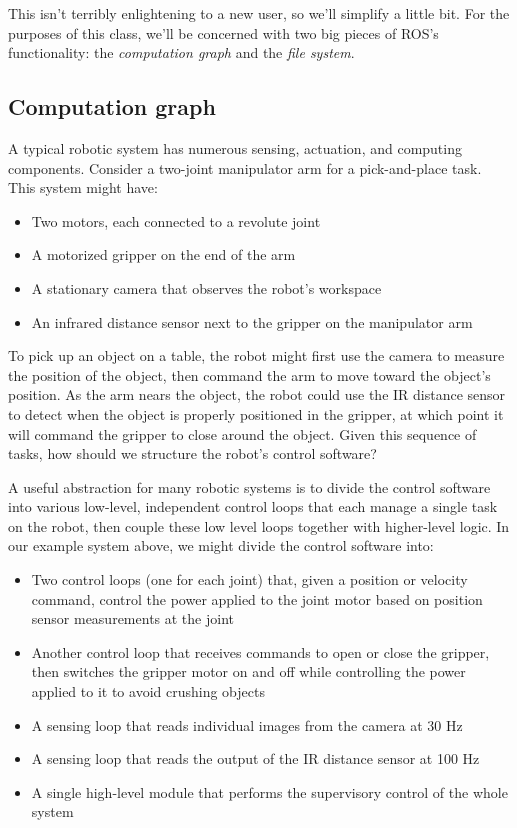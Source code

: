 \documentclass{article}
\begin{document}
This isn't terribly enlightening to a new user, so we'll simplify a little bit. For the purposes of this class, we'll be concerned with two big pieces of ROS's functionality: the \emph{computation graph} and the \emph{file system}.

\subsection{Computation graph}
A typical robotic system has numerous sensing, actuation, and computing components. Consider a two-joint manipulator arm for a pick-and-place task. This system might have:
\begin{itemize}
\item Two motors, each connected to a revolute joint
\item A motorized gripper on the end of the arm
\item A stationary camera that observes the robot's workspace
\item An infrared distance sensor next to the gripper on the manipulator arm
\end{itemize}

To pick up an object on a table, the robot might first use the camera to measure the position of the object, then command the arm to move toward the object's position. As the arm nears the object, the robot could use the IR distance sensor to detect when the object is properly positioned in the gripper, at which point it will command the gripper to close around the object. Given this sequence of tasks, how should we structure the robot's control software?

A useful abstraction for many robotic systems is to divide the control software into various low-level, independent control loops that each manage a single task on the robot, then couple these low level loops together with higher-level logic. In our example system above, we might divide the control software into:
\begin{itemize}
\item Two control loops (one for each joint) that, given a position or velocity command, control the power applied to the joint motor based on position sensor measurements at the joint
\item Another control loop that receives commands to open or close the gripper, then switches the gripper motor on and off while controlling the power applied to it to avoid crushing objects
\item A sensing loop that reads individual images from the camera at 30 Hz
\item A sensing loop that reads the output of the IR distance sensor at 100 Hz
\item A single high-level module that performs the supervisory control of the whole system
\end{itemize}
\end{document}
